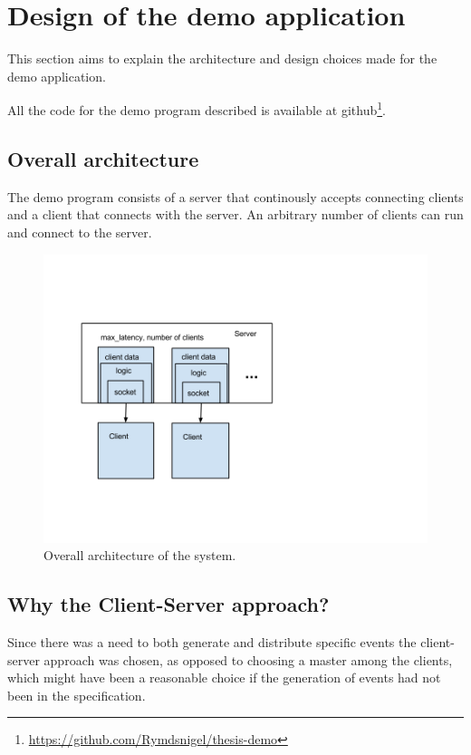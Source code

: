 \chapter{Design of the demo application}

This section aims to explain the architecture and design choices made for the demo application.

All the code for the demo program described is available at github\footnote{ \url{https://github.com/Rymdsnigel/thesis-demo}}.

\section{Overall architecture}
The demo program consists of a server that continously accepts connecting clients and a client that connects with the server. An arbitrary number of clients can run and connect to the server. 

\begin{figure}[h!]
\centering
\includegraphics[width=1.0\textwidth]{figures/arch.png}
\caption{Overall architecture of the system.}
\end{figure}



\section{Why the Client-Server approach?}
Since there was a need to both generate and distribute specific events the client-server approach was chosen, as opposed to choosing a master among the clients, which might have been a reasonable choice if the generation of events had not been in the specification. 


